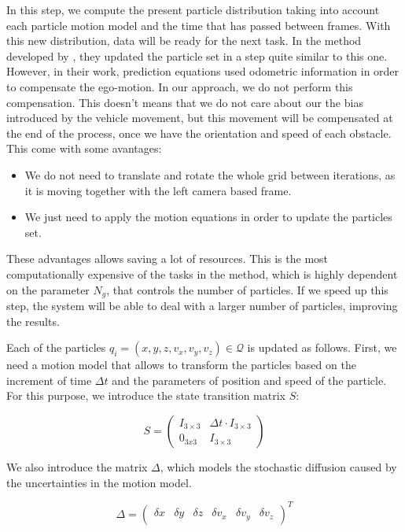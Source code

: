 In this step, we compute the present particle distribution taking into account each particle motion model and the time that has passed between frames. With this new distribution, data will be ready for the next task. In the method developed by \cite{danescu2012particle}, they updated the particle set in a step quite similar to this one. However, in their work, prediction equations used odometric information in order to compensate the ego-motion. In our approach, we do not perform this compensation. This doesn't means that we do not care about our the bias introduced by the vehicle movement, but this movement will be compensated at the end of the process, once we have the orientation and speed of each obstacle. This come with some avantages:
\begin{itemize}
 \item We do not need to translate and rotate the whole grid between iterations, as it is moving together with the left camera based frame.
 \item We just need to apply the motion equations in order to update the particles set.
\end{itemize}

These advantages allows saving a lot of resources. This is the most computationally expensive of the tasks in the method, which is highly dependent on the parameter $N_g$, that controls the number of particles. If we speed up this step, the system will be able to deal with a larger number of particles, improving the results.

Each of the particles $q_i = (x, y, z, v_x, v_y, v_z) \in \mathcal{Q}$ is updated as follows. First, we need a motion model that allows to transform the particles based on the increment of time $\Delta t$ and the parameters of position and speed of the particle. For this purpose, we introduce the state transition matrix $S$:

\begin{equation}\label{eq:cp05_state_transition_matrix}
S =
\left( \begin{array}{cc}
I_{3\times3} & \Delta t \cdot I_{3\times3} \\
0_{3x3} & I_{3\times3} \end{array} \right)
\end{equation}

We also introduce the matrix $\Delta$, which models the stochastic diffusion caused by the uncertainties in the motion model.

\begin{equation}\label{eq:cp05_state_motion_model_uncertainties}
\Delta =
\left( \begin{array}{cccccc}
\delta x & \delta y & \delta z & \delta v_x & \delta v_y & \delta v_z
\end{array} \right)^T
\end{equation}

